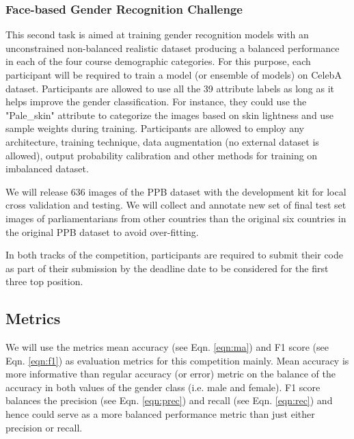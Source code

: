 \documentclass[11pt, oneside]{article}
\begin{document}
\subsubsection{Face-based Gender Recognition Challenge}
This second task is aimed at training gender recognition models with an 
unconstrained non-balanced realistic dataset producing a balanced performance 
in each of the four course demographic categories. For this purpose, each 
participant will be required to train a model (or ensemble of models) on CelebA 
dataset. Participants are allowed to use all the 39 attribute labels as long as 
it helps improve the gender classification. For instance, they could use the 
"Pale\_skin" attribute to categorize the images based on skin lightness and use 
sample weights during training. Participants are allowed to employ any 
architecture, training technique, data augmentation (no external dataset is 
allowed), output probability calibration and other methods for training on 
imbalanced dataset.

We will release 636 images of the PPB dataset with the development kit for 
local cross validation and testing. We will collect and annotate new set of 
final test set images of parliamentarians from other countries than the 
original six countries in the original PPB dataset to avoid over-fitting.

In both tracks of the competition, participants are required to submit their 
code as part of their submission by the deadline date to be considered for the 
first three top position.


\subsection{Metrics}
\label{sec:metrics}
We will use the metrics mean accuracy (see Eqn. \ref{eqn:ma}) and F1 score (see 
Eqn. \ref{eqn:f1}) as evaluation metrics for this competition mainly. Mean 
accuracy is more informative than regular accuracy (or error) metric on the 
balance of the accuracy in both values of the gender class (i.e. male and 
female). F1 score balances the precision (see Eqn. \ref{eqn:prec}) and recall 
(see Eqn. \ref{eqn:rec}) and hence could serve as a more balanced performance 
metric than just either precision or recall.
\end{document}
